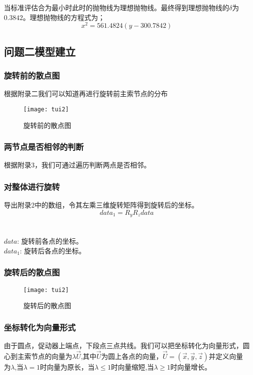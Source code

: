 \documentclass[withoutpreface,bwprint]{cumcmthesis} %
\numberwithin{equation}{subsection}
\begin{document}
当标准评估合为最小时此时的抛物线为理想抛物线。最终得到理想抛物线的$\delta$为$0.3842$。理想抛物线的方程式为；
\begin{equation}
	x^{2}=561.4824(y-300.7842)
\end{equation}

\subsection{问题二模型建立}

\subsubsection{旋转前的散点图}

根据附录二我们可以知道再进行旋转前主索节点的分布
\begin{figure}[!h]
	\centering
	\texttt{[image: tui2]}
	\caption{旋转前的散点图}
	\label{fig:2}
\end{figure}

\subsubsection{两节点是否相邻的判断}
根据附录3，我们可通过遍历判断两点是否相邻。

\subsubsection{对整体进行旋转}
导出附录2中的数组，令其左乘三维旋转矩阵得到旋转后的坐标。
\begin{equation}
data_1=R_yR_zdata
\end{equation}\\
\\
$data$: 旋转前各点的坐标。\\
$data_1$: 旋转后各点的坐标。

\subsubsection{旋转后的散点图}

\begin{figure}[!h]
	\centering
	\texttt{[image: tui2]}
	\caption{旋转后的散点图}
	\label{fig:2}
\end{figure}

\subsubsection{坐标转化为向量形式}
由于圆点，促动器上端点，下段点三点共线。我们可以把坐标转化为向量形式，圆心到主索节点的向量为$\lambda\vec{U}$,其中$\vec{U}$为圆上各点的向量，$\vec{U}=(\vec{x},\vec{y},\vec{z})$并定义向量为$\lambda$,当$\lambda=1$时向量为原长，当$\lambda\le1$时向量缩短,当$\lambda\ge1$时向量增长。
\end{document}
